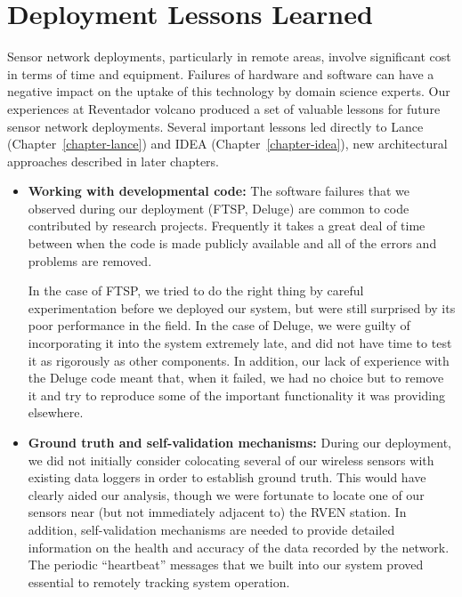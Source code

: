 \section{Deployment Lessons Learned}
\label{evaluation-sec-lessons}

Sensor network deployments, particularly in remote areas, involve significant
cost in terms of time and equipment. Failures of hardware and software can
have a negative impact on the uptake of this technology by domain science
experts. Our experiences at Reventador volcano produced a set of valuable
lessons for future sensor network deployments. Several important lessons led
directly to Lance (Chapter~\ref{chapter-lance}) and IDEA
(Chapter~\ref{chapter-idea}), new architectural approaches described in later
chapters.

\begin{itemize}

\item \textbf{Working with developmental code:} The software failures that we
observed during our deployment (FTSP, Deluge) are common to code contributed
by research projects. Frequently it takes a great deal of time between when
the code is made publicly available and all of the errors and problems are
removed.

In the case of FTSP, we tried to do the right thing by careful
experimentation before we deployed our system, but were still surprised by
its poor performance in the field. In the case of Deluge, we were guilty of
incorporating it into the system extremely late, and did not have time to
test it as rigorously as other components. In addition, our lack of
experience with the Deluge code meant that, when it failed, we had no choice
but to remove it and try to reproduce some of the important functionality it
was providing elsewhere.

\item \textbf{Ground truth and self-validation mechanisms:}
During our deployment, we did not initially consider colocating several
of our wireless sensors with existing data loggers in order to establish
ground truth. This would have clearly aided our analysis, though we were
fortunate to locate one of our sensors near (but not immediately adjacent to)
the RVEN station. In addition, self-validation mechanisms are needed to
provide detailed information on the health and accuracy of the data recorded
by the network. The periodic ``heartbeat'' messages that we built into our
system proved essential to remotely tracking system operation.


\end{itemize}
